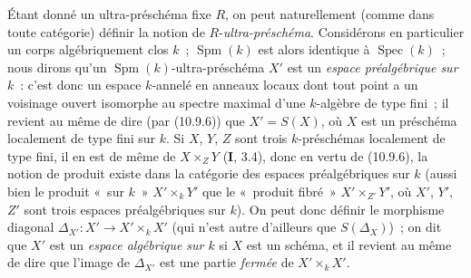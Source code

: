 \begin{env}[10.10.2]
\label{IV.10.10.2-fr}
Étant donné un ultra-préschéma fixe $R$, on peut naturellement (comme dans
toute catégorie) définir la notion de $R$-\emph{ultra-préschéma}. Considérons
en particulier un corps algébriquement clos $k$~; $\operatorname{Spm}(k)$ est
alors identique à $\operatorname{Spec}(k)$~; nous dirons qu'un
$\operatorname{Spm}(k)$-ultra-préschéma $X'$ est un \emph{espace
préalgébrique sur $k$}~: c'est donc un espace $k$-annelé en anneaux locaux dont
tout point a un voisinage ouvert isomorphe au spectre maximal d'une $k$-algèbre
de type fini~; il revient au même de dire (par (10.9.6)) que $X'=S(X)$, où $X$
est un préschéma localement de type fini sur $k$. Si $X$, $Y$, $Z$ sont trois
$k$-préschémas localement de type fini, il en est de même de
$X\times_ZY$ (\textbf I, 3.4), donc en vertu de (10.9.6), la notion de produit
existe dans la catégorie des espaces préalgébriques sur $k$ (aussi bien le
produit «~sur $k$~» $X'\times_kY'$ que le «~produit fibré~»
$X'\times_{Z'}Y'$, où $X'$, $Y'$, $Z'$ sont trois espaces préalgébriques sur
$k$). On peut donc définir le morphisme diagonal
$\Delta_{X'}:X'\to X'\times_kX'$ (qui n'est autre d'ailleurs que
$S(\Delta_X)$)~; on dit que $X'$ est un \emph{espace algébrique sur $k$} si
$X$ est un schéma, et il revient au même de dire que l'image de $\Delta_{X'}$
est une partie \emph{fermée} de $X'\times_kX'$.
\end{env}

